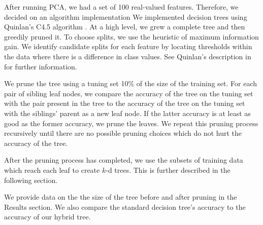 After running PCA, we had a set of 100 real-valued features. 
Therefore, we decided on an algorithm implementation
We implemented decision trees using Quinlan's C4.5 algorithm \cite{quinlan2014c4}.
At a high level, we grew a complete tree and then greedily pruned it.
To choose splits, we use the heuristic of maximum information gain.  We identify candidate splits for each feature by locating thresholds within the data where there is a difference in class values.  See Quinlan's description in \cite{quinlan1996improved} for further information.

We prune the tree using a tuning set 10\% of the size of the training set.
For each pair of sibling leaf nodes, we compare the accuracy of the tree on the tuning set with the pair present in the tree to the accuracy of the tree on the tuning set with the siblings' parent as a new leaf node.
If the latter accuracy is at least as good as the former accuracy, we prune the leaves.  We repeat this pruning process recursively until there are no possible pruning choices which do not hurt the accuracy of the tree.

After the pruning process has completed, we use the subsets of training data which reach each leaf to create $k$-d trees.  This is further described in the following section.

We provide data on the the size of the tree before and after pruning in the Results section.  We also compare the standard decision tree's accuracy to the accuracy of our hybrid tree.

